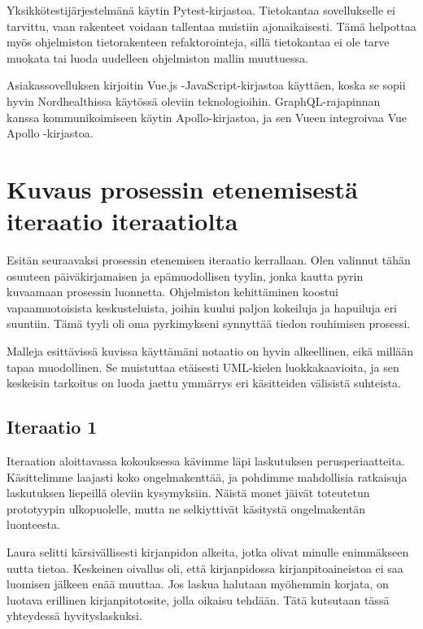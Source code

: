Yksikkötestijärjestelmänä käytin Pytest-kirjastoa. Tietokantaa
sovellukselle ei tarvittu, vaan rakenteet voidaan tallentaa muistiin
ajonaikaisesti. Tämä helpottaa myös ohjelmiston tietorakenteen
refaktorointeja, sillä tietokantaa ei ole tarve muokata tai luoda
uudelleen ohjelmiston mallin muuttuessa.

Asiakassovelluksen kirjoitin Vue.js -JavaScript-kirjastoa käyttäen,
koska se sopii hyvin Nordhealthissa käytössä oleviin teknologioihin.
GraphQL-rajapinnan kanssa kommunikoimiseen käytin Apollo-kirjastoa, ja
sen Vueen integroivaa Vue Apollo -kirjastoa.

\hypertarget{kuvaus-prosessin-etenemisestuxe4-iteraatio-iteraatiolta}{%
\section{Kuvaus prosessin etenemisestä iteraatio
iteraatiolta}\label{kuvaus-prosessin-etenemisestuxe4-iteraatio-iteraatiolta}}

Esitän seuraavaksi prosessin etenemisen iteraatio kerrallaan. Olen
valinnut tähän osuuteen päiväkirjamaisen ja epämuodollisen tyylin, jonka
kautta pyrin kuvaamaan prosessin luonnetta. Ohjelmiston kehittäminen
koostui vapaamuotoisista keskusteluista, joihin kuului paljon kokeiluja
ja hapuiluja eri suuntiin. Tämä tyyli oli oma pyrkimykseni synnyttää
tiedon rouhimisen prosessi.

Malleja esittävissä kuvissa käyttämäni notaatio on hyvin alkeellinen,
eikä millään tapaa muodollinen. Se muistuttaa etäisesti UML-kielen
luokkakaavioita, ja sen keskeisin tarkoitus on luoda jaettu ymmärrys eri
käsitteiden välisistä suhteista.

\hypertarget{iteraatio-1}{%
\subsection{Iteraatio 1}\label{iteraatio-1}}

Iteraation aloittavassa kokouksessa kävimme läpi laskutuksen
perusperiaatteita. Käsittelimme laajasti koko ongelmakenttää, ja
pohdimme mahdollisia ratkaisuja laskutuksen liepeillä oleviin
kysymyksiin. Näistä monet jäivät toteutetun prototyypin ulkopuolelle,
mutta ne selkiyttivät käsitystä ongelmakentän luonteesta.

Laura selitti kärsivällisesti kirjanpidon alkeita, jotka olivat minulle
enimmäkseen uutta tietoa. Keskeinen oivallus oli, että kirjanpidossa
kirjanpitoaineistoa ei saa luomisen jälkeen enää muuttaa. Jos laskua
halutaan myöhemmin korjata, on luotava erillinen kirjanpitotosite, jolla
oikaisu tehdään. Tätä kutsutaan tässä yhteydessä hyvityslaskuksi.


